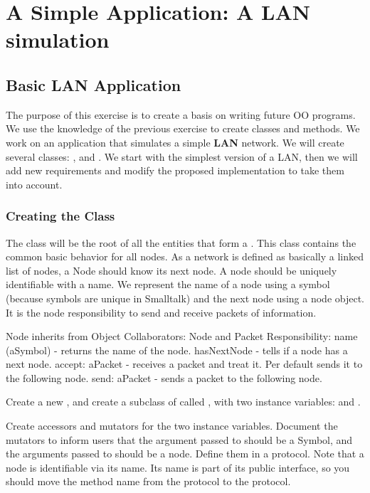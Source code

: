 \ifx\wholebook\relax\else


\fi

\chapter{A Simple Application: A LAN simulation}
\section*{Basic LAN Application }

The purpose of this exercise is to create a basis on writing
future OO programs. We use the knowledge of the previous
exercise to create classes and methods. We work on an
application that simulates a simple \textbf{LAN} network.  We will
create several classes: , and
. We start with the simplest version of a LAN,
then we will add new requirements and modify the proposed
implementation to take them into account.

\subsection*{Creating the Class }

The class  will be the root of all the entities that
form a . This class contains the common basic behavior
for all nodes. As a network is defined as basically a linked list
of nodes, a Node should know its next node. A node should be
uniquely identifiable with a name. We represent the name of a node
using a symbol (because symbols are unique in Smalltalk) and the
next node using a node object. It is the node responsibility to
send and receive packets of information.

\begin{code}
Node inherits from Object 
Collaborators: Node and Packet
Responsibility:
name (aSymbol) - returns the name of the node.
hasNextNode - tells if a node has a next node.
accept: aPacket - receives a packet and treat it. 
Per default sends it to the following node.
send: aPacket - sends a packet to the following node.
\end{code}


\exercise  Create a new \category {}, and create a
subclass of  called , with two instance
variables:  and . 

\exercise  Create accessors and mutators for the two instance
variables. Document the mutators to inform users that the argument
passed to  should be a Symbol, and the arguments
passed to  should be a node. Define them in a
 protocol. Note that a node is identifiable via
its name. Its name is part of its public interface, so you should
move the method name from the  protocol to the
 protocol. \\

